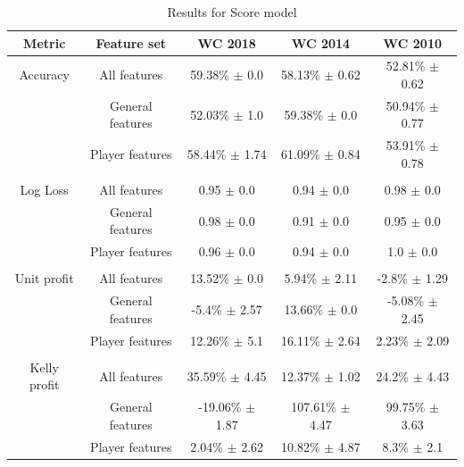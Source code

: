\begin{table}
    \caption{Results for Score model}
    \begin{tabular}{| c  c| c| c| c|}
        \hline
        Metric& Feature set & \textbf{WC 2018} & \textbf{WC 2014} & \textbf{WC 2010}\\
        \hline
        Accuracy & All features & 59.38\% $\pm$ 0.0 & 58.13\% $\pm$ 0.62 & 52.81\% $\pm$ 0.62 \\
 & General features & 52.03\% $\pm$ 1.0 & 59.38\% $\pm$ 0.0 & 50.94\% $\pm$ 0.77 \\
 & Player features & 58.44\% $\pm$ 1.74 & 61.09\% $\pm$ 0.84 & 53.91\% $\pm$ 0.78 \\
 &  & & &  \\
Log Loss & All features & 0.95 $\pm$ 0.0 & 0.94 $\pm$ 0.0 & 0.98 $\pm$ 0.0 \\
 & General features & 0.98 $\pm$ 0.0 & 0.91 $\pm$ 0.0 & 0.95 $\pm$ 0.0 \\
 & Player features & 0.96 $\pm$ 0.0 & 0.94 $\pm$ 0.0 & 1.0 $\pm$ 0.0 \\
 &  & & &  \\
Unit profit & All features & 13.52\% $\pm$ 0.0 & 5.94\% $\pm$ 2.11 & -2.8\% $\pm$ 1.29 \\
 & General features & -5.4\% $\pm$ 2.57 & 13.66\% $\pm$ 0.0 & -5.08\% $\pm$ 2.45 \\
 & Player features & 12.26\% $\pm$ 5.1 & 16.11\% $\pm$ 2.64 & 2.23\% $\pm$ 2.09 \\
 &  & & &  \\
Kelly profit & All features & 35.59\% $\pm$ 4.45 & 12.37\% $\pm$ 1.02 & 24.2\% $\pm$ 4.43 \\
 & General features & -19.06\% $\pm$ 1.87 & 107.61\% $\pm$ 4.47 & 99.75\% $\pm$ 3.63 \\
 & Player features & 2.04\% $\pm$ 2.62 & 10.82\% $\pm$ 4.87 & 8.3\% $\pm$ 2.1 \\
 \hline
    \end{tabular}
    \label{table:scoreresults}
\end{table}

